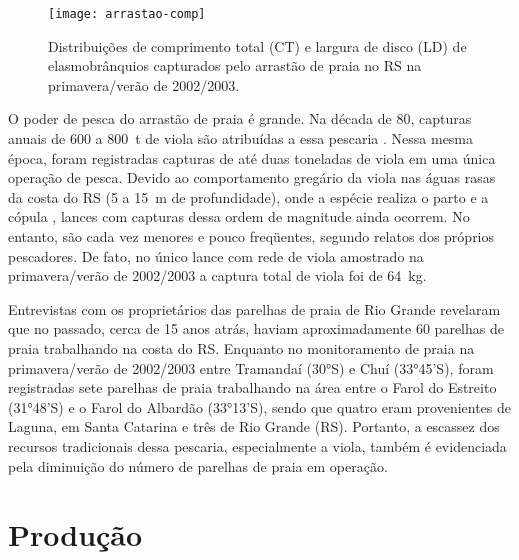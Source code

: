 \documentclass[a4paper,11pt,twoside,showtrims,onecolumn,openright,final]{memoir}
\begin{document}
\clearpage

\begin{figure}
\begin{center}
\texttt{[image: arrastao-comp]}
\end{center}
\caption[Distribuições de comprimento dos elasmobrânquios capturados pelo arrastão de praia]
        {Distribuições de comprimento total (CT) e largura de disco (LD) de elasmobrânquios
         capturados pelo arrastão de praia no RS na primavera/verão de 2002/2003.}
\label{fig:arrastao-comp}	 
\end{figure}

O poder de pesca do arrastão de praia é grande. Na década de 80, 
capturas anuais de 600 a 800~t de viola são atribuídas 
a essa pescaria \citep{lessa1982}. Nessa mesma época, foram 
registradas capturas de até duas toneladas de viola em uma 
única operação de pesca. Devido ao comportamento gregário da viola
nas águas rasas da costa do RS (5 a 15~m de profundidade), onde a espécie realiza 
o parto e a cópula \citep{lessa1986}, lances com capturas dessa ordem de magnitude 
ainda ocorrem. No entanto, são cada vez menores e pouco freqüentes, segundo relatos dos
próprios pescadores. De fato, no único lance com rede de viola 
amostrado na primavera/verão de 2002/2003 a captura total de viola 
foi de 64~kg.

Entrevistas com os proprietários das parelhas de praia de Rio Grande 
revelaram que no passado, cerca de 15 anos atrás, haviam 
aproximadamente 60 parelhas de praia trabalhando 
na costa do RS. Enquanto no monitoramento de praia na 
primavera/verão de 2002/2003 entre Tramandaí (30°S) e Chuí (33°45'S),
foram registradas sete parelhas de praia trabalhando na área entre o 
Farol do Estreito (31°48'S) e o Farol do Albardão (33°13'S), sendo 
que quatro eram provenientes de Laguna, em Santa Catarina 
e três de Rio Grande (RS). Portanto, a escassez dos recursos tradicionais 
dessa pescaria, especialmente a viola, também é evidenciada pela diminuição do número 
de parelhas de praia em operação.

\section*{Produção}

\end{document}
